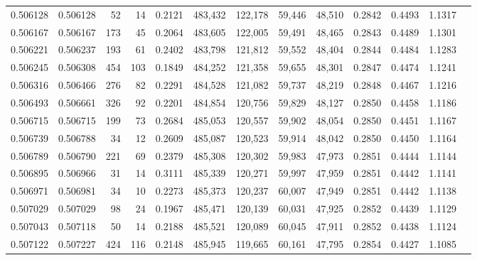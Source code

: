 \begin{tabular}{rrrrrrrrrrrrr}
0.506128 & 0.506128 &    52 &    14 &                                     0.2121 & 483,432 & 122,178 &  59,446 &  48,510 & 0.2842 & 0.4493 & 1.1317 \\
0.506167 & 0.506167 &   173 &    45 &                                     0.2064 & 483,605 & 122,005 &  59,491 &  48,465 & 0.2843 & 0.4489 & 1.1301 \\
0.506221 & 0.506237 &   193 &    61 &                                     0.2402 & 483,798 & 121,812 &  59,552 &  48,404 & 0.2844 & 0.4484 & 1.1283 \\
0.506245 & 0.506308 &   454 &   103 &                                     0.1849 & 484,252 & 121,358 &  59,655 &  48,301 & 0.2847 & 0.4474 & 1.1241 \\
0.506316 & 0.506466 &   276 &    82 &                                     0.2291 & 484,528 & 121,082 &  59,737 &  48,219 & 0.2848 & 0.4467 & 1.1216 \\
0.506493 & 0.506661 &   326 &    92 &                                     0.2201 & 484,854 & 120,756 &  59,829 &  48,127 & 0.2850 & 0.4458 & 1.1186 \\
0.506715 & 0.506715 &   199 &    73 &                                     0.2684 & 485,053 & 120,557 &  59,902 &  48,054 & 0.2850 & 0.4451 & 1.1167 \\
0.506739 & 0.506788 &    34 &    12 &                                     0.2609 & 485,087 & 120,523 &  59,914 &  48,042 & 0.2850 & 0.4450 & 1.1164 \\
0.506789 & 0.506790 &   221 &    69 &                                     0.2379 & 485,308 & 120,302 &  59,983 &  47,973 & 0.2851 & 0.4444 & 1.1144 \\
0.506895 & 0.506966 &    31 &    14 &                                     0.3111 & 485,339 & 120,271 &  59,997 &  47,959 & 0.2851 & 0.4442 & 1.1141 \\
0.506971 & 0.506981 &    34 &    10 &                                     0.2273 & 485,373 & 120,237 &  60,007 &  47,949 & 0.2851 & 0.4442 & 1.1138 \\
0.507029 & 0.507029 &    98 &    24 &                                     0.1967 & 485,471 & 120,139 &  60,031 &  47,925 & 0.2852 & 0.4439 & 1.1129 \\
0.507043 & 0.507118 &    50 &    14 &                                     0.2188 & 485,521 & 120,089 &  60,045 &  47,911 & 0.2852 & 0.4438 & 1.1124 \\
0.507122 & 0.507227 &   424 &   116 &                                     0.2148 & 485,945 & 119,665 &  60,161 &  47,795 & 0.2854 & 0.4427 & 1.1085 \\

\end{tabular}
